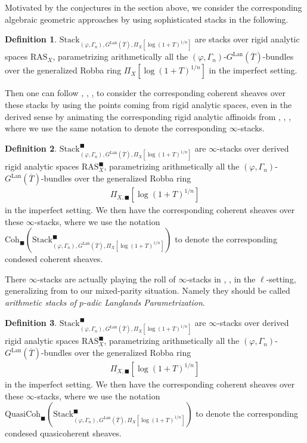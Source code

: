 \documentclass[12pt]{article}
\theoremstyle{definition}
\newtheorem{definition}{Definition}
\begin{document}
\noindent Motivated by the conjectures in the section above, we consider the corresponding algebraic geometric approaches by using sophisticated stacks in the following.

\begin{definition}
$\mathrm{Stack}_{(\varphi,\Gamma_n), G^\mathrm{Lan}(\overline{T}),\Pi_X[\log(1+T)^{1/n}]}$ are stacks over rigid analytic spaces $\mathrm{RAS}_X$, parametrizing arithmetically all the $(\varphi,\Gamma_n)$-$G^\mathrm{Lan}(\overline{T})$-bundles over the generalized Robba ring $\Pi_X[\log(1+T)^{1/n}]$ in the imperfect setting.
\end{definition}

\indent Then one can follow \cite{FS}, \cite{DHKM}, \cite{EGH}, \cite{Z} to consider the corresponding coherent sheaves over these stacks by using the points coming from rigid analytic spaces, even in the derived sense by animating the corresponding rigid analytic affinoids from \cite{CSA}, \cite{CSB}, \cite{CSC}, where we use the same notation to denote the corresponding $\infty$-stacks.

\begin{definition}
$\mathrm{Stack}^\blacksquare_{(\varphi,\Gamma_n), G^\mathrm{Lan}(\overline{T}),\Pi_X[\log(1+T)^{1/n}]}$ are $\infty$-stacks over derived rigid analytic spaces $\mathrm{RAS}^\blacksquare_X$, parametrizing arithmetically all the $(\varphi,\Gamma_n)$-$G^\mathrm{Lan}(\overline{T})$-bundles over the generalized Robba ring
 \begin{align}
 \Pi_{X,\blacksquare}[\log(1+T)^{1/n}]
 \end{align}
 in the imperfect setting. We then have the corresponding coherent sheaves over these $\infty$-stacks, where we use the notation $\mathrm{Coh}_\blacksquare(\mathrm{Stack}^\blacksquare_{(\varphi,\Gamma_n), G^\mathrm{Lan}(\overline{T}),\Pi_X[\log(1+T)^{1/n}]})$ to denote the corresponding condesed coherent sheaves.
\end{definition}

There $\infty$-stacks are actually playing the roll of $\infty$-stacks in \cite{FS}, \cite{DHKM}, \cite{Z} in the $\ell$-setting, generalizing from \cite{EGH} to our mixed-parity situation. Namely they should be called  \textit{arithmetic stacks of $p$-adic Langlands Parametrization}.
 
\begin{definition}
$\mathrm{Stack}^\blacksquare_{(\varphi,\Gamma_n), G^\mathrm{Lan}(\overline{T}),\Pi_X[\log(1+T)^{1/n}]}$ are $\infty$-stacks over derived rigid analytic spaces $\mathrm{RAS}^\blacksquare_X$, parametrizing arithmetically all the $(\varphi,\Gamma_n)$-$G^\mathrm{Lan}(\overline{T})$-bundles over the generalized Robba ring 
\begin{align}
\Pi_{X,\blacksquare}[\log(1+T)^{1/n}]
\end{align}
in the imperfect setting. We then have the corresponding coherent sheaves over these $\infty$-stacks, where we use the notation $\mathrm{QuasiCoh}_\blacksquare(\mathrm{Stack}^\blacksquare_{(\varphi,\Gamma_n), G^\mathrm{Lan}(\overline{T}),\Pi_X[\log(1+T)^{1/n}]})$ to denote the corresponding condesed quasicoherent sheaves.
\end{definition}
\end{document}
